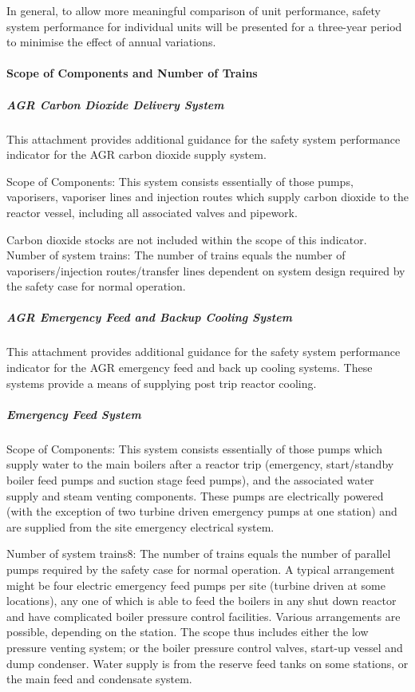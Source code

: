 In general, to allow more meaningful comparison of unit performance,
safety system performance for individual units will be presented for a
three-year period to minimise the effect of annual variations.

\paragraph{Scope of Components and Number of Trains}
\subparagraph{AGR Carbon Dioxide Delivery System}

This attachment provides additional guidance for the safety system
performance indicator for the AGR carbon dioxide supply system.

Scope of Components: This system consists essentially of those pumps,
vaporisers, vaporiser lines and injection routes which supply carbon
dioxide to the reactor vessel, including all associated valves and
pipework.

Carbon dioxide stocks are not included within the scope of this indicator.
Number of system trains: The number of trains equals the number of
vaporisers/injection routes/transfer lines dependent on system design
required by the safety case for normal operation.

\subparagraph{AGR Emergency Feed and Backup Cooling System}

This attachment provides additional guidance for the safety system performance indicator for the AGR emergency feed and back up cooling systems. These systems provide a means of supplying post trip reactor cooling.

\subparagraph{Emergency Feed System}

Scope of Components: This system consists essentially of those pumps
which supply water to the main boilers after a reactor trip
(emergency, start/standby boiler feed pumps and suction stage feed
pumps), and the associated water supply and steam venting
components. These pumps are electrically powered (with the exception
of two turbine driven emergency pumps at one station) and are supplied
from the site emergency electrical system.

Number of system trains8: The number of trains equals the number of
parallel pumps required by the safety case for normal operation. A
typical arrangement might be four electric emergency feed pumps per
site (turbine driven at some locations), any one of which is able to
feed the boilers in any shut down reactor and have complicated boiler
pressure control facilities. Various arrangements are possible,
depending on the station. The scope thus includes either the low
pressure venting system; or the boiler pressure control valves,
start-up vessel and dump condenser. Water supply is from the reserve
feed tanks on some stations, or the main feed and condensate system.

